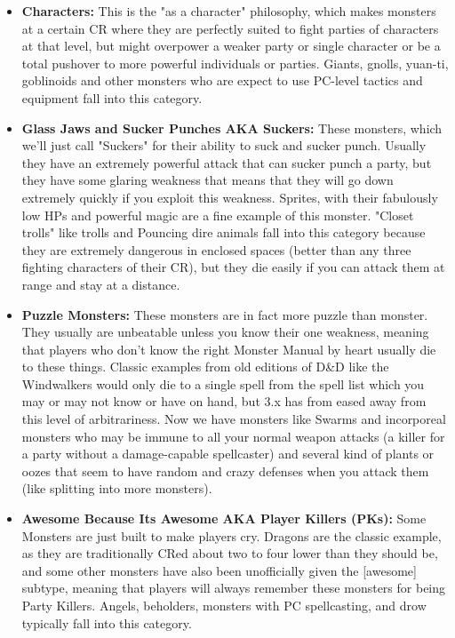 \begin{itemize}\itemspace
   \item \textbf{Characters:} This is the "as a character" philosophy, which makes monsters at a certain CR where they are perfectly suited to fight parties of characters at that level, but might overpower a weaker party or single character or be a total pushover to more powerful individuals or parties. Giants, gnolls, yuan-ti, goblinoids and other monsters who are expect to use PC-level tactics and equipment fall into this category.
   \item \textbf{Glass Jaws and Sucker Punches AKA Suckers:} These monsters, which we'll just call "Suckers" for their ability to suck and sucker punch. Usually they have an extremely powerful attack that can sucker punch a party, but they have some glaring weakness that means that they will go down extremely quickly if you exploit this weakness. Sprites, with their fabulously low HPs and powerful magic are a fine example of this monster. "Closet trolls" like trolls and Pouncing dire animals fall into this category because they are extremely dangerous in enclosed spaces (better than any three fighting characters of their CR), but they die easily if you can attack them at range and stay at a distance.
   \item \textbf{Puzzle Monsters:} These monsters are in fact more puzzle than monster. They usually are unbeatable unless you know their one weakness, meaning that players who don't know the right Monster Manual by heart usually die to these things. Classic examples from old editions of D\&D like the Windwalkers would only die to a single spell from the spell list which you may or may not know or have on hand, but 3.x has from eased away from this level of arbitrariness. Now we have monsters like Swarms and incorporeal monsters who may be immune to all your normal weapon attacks (a killer for a party without a damage-capable spellcaster) and several kind of plants or oozes that seem to have random and crazy defenses when you attack them (like splitting into more monsters).
   \item \textbf{Awesome Because Its Awesome AKA Player Killers (PKs):} Some Monsters are just built to make players cry. Dragons are the classic example, as they are traditionally CRed about two to four lower than they should be, and some other monsters have also been unofficially given the [awesome] subtype, meaning that players will always remember these monsters for being Party Killers. Angels, beholders, monsters with PC spellcasting, and drow typically fall into this category.
\end{itemize}


